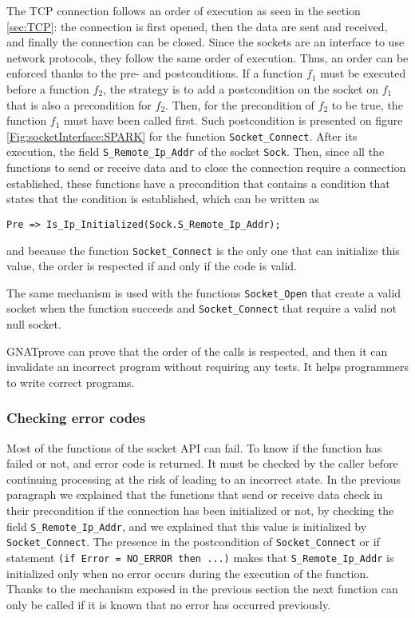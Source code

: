 \documentclass[runningheads]{llncs}
\begin{document}
    The TCP connection follows an order of execution as seen in the section \ref{sec:TCP}: the connection is first opened,
    then the data are sent and received, and finally the connection can be closed. Since the sockets are an interface to use
    network protocols, they follow the same order of execution. Thus, an order can be enforced thanks to the pre- and postconditions.
    If a function $f_1$ must be executed before a function $f_2$, the strategy is to add a postcondition on the socket on $f_1$
    that is also a precondition for $f_2$. Then, for the precondition of $f_2$ to be true, the function $f_1$ must have been called first.
    Such postcondition is presented on figure \ref{Fig:socketInterface:SPARK} for the function \lstinline{Socket_Connect}. After its
    execution, the field \lstinline{S_Remote_Ip_Addr} of the socket \lstinline{Sock}. Then, since all the functions to send or receive
    data and to close the connection require a connection established, these functions have a precondition that contains a condition
    that states that the condition is established, which can be written as
    \begin{lstlisting}
Pre => Is_Ip_Initialized(Sock.S_Remote_Ip_Addr);
    \end{lstlisting}
    and because the function \lstinline{Socket_Connect} is the only one that can initialize this value, the order is respected
    if and only if the code is valid.

    The same mechanism is used with the functions \lstinline{Socket_Open} that create a valid socket when the function
    succeeds and \lstinline{Socket_Connect} that require a valid not null socket.
    
    GNATprove can prove that the order of the calls is respected, and then it can invalidate an incorrect program without requiring any
    tests. It helps programmers to write correct programs.


\subsubsection{Checking error codes}

    Most of the functions of the socket API can fail. To know if the function has failed or not, and error code is returned.
    It must be checked by the caller before continuing processing at the risk of leading to an incorrect state.
    In the previous paragraph we explained that the functions that send or receive data check in their precondition if the connection
    has been initialized or not, by checking the field \lstinline{S_Remote_Ip_Addr}, and we explained that this value is initialized
    by \lstinline{Socket_Connect}. The presence in the postcondition of \lstinline{Socket_Connect} or if statement
    \lstinline{(if Error = NO_ERROR then ...)} makes that \lstinline{S_Remote_Ip_Addr} is initialized only when no error occurs during
    the execution of the function. Thanks to the mechanism exposed in the previous section the next function can only be called
    if it is known that no error has occurred previously.
    
\end{document}
